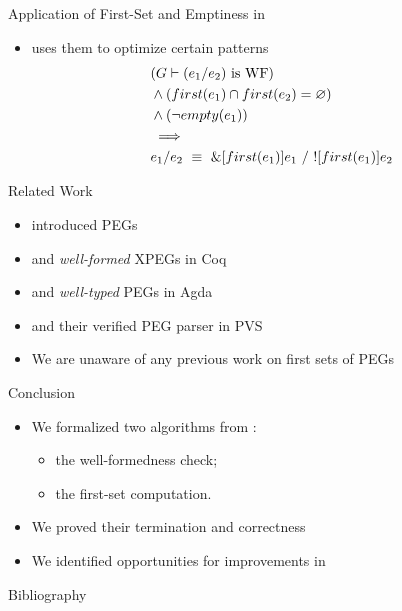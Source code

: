 \documentclass{beamer}
\begin{document}
\begin{frame}{Application of First-Set and Emptiness in \lpeg{}}
    \begin{itemize}
        \item \lpeg{} uses them to optimize certain patterns
        \begin{align*}
            & (\text{$G \vdash (e_1/e_2)$ is WF}) \\
            & \wedge (first(e_1) \cap first(e_2) = \EmptySet{}) \\
            & \wedge (\neg empty(e_1)) \\
            & \implies \\
            & e_1/e_2\ \equiv\ \PChoice{\PAnd{\PSet{first(e_1)}}e_1}{\PNot{\PSet{first(e_1)}}e_2}
        \end{align*}
    \end{itemize}
\end{frame}

\begin{frame}{Related Work}
    \begin{itemize}
        \item \cite{ford_parsing_2004} introduced PEGs
        \item \cite{koprowski_trx_2011} and \emph{well-formed} XPEGs in Coq
        \item \cite{ribeiro_towards_2019} and \emph{well-typed} PEGs in Agda
        \item \cite{blaudeau_verified_2020} and their verified PEG parser in PVS
        \item We are unaware of any previous work on first sets of PEGs
    \end{itemize}
\end{frame}

\begin{frame}{Conclusion}
    \begin{itemize}
        \item We formalized two algorithms from \lpeg{}:
        \begin{itemize}
            \item the well-formedness check;
            \item the first-set computation.
        \end{itemize}
        \item We proved their termination and correctness
        \item We identified opportunities for improvements in \lpeg{}
    \end{itemize}
\end{frame}

\begin{frame}{Bibliography}
    
    
\end{frame}
\end{document}
